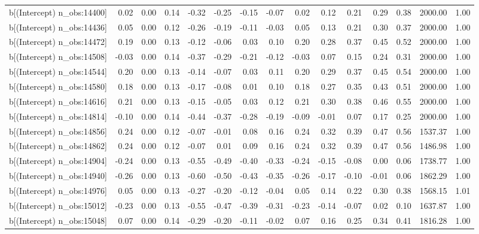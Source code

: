 \begin{table}[ht]
\begin{tabular}{rrrrrrrrrrrrrrr}
  b[(Intercept) n\_obs:14400] & 0.02 & 0.00 & 0.14 & -0.32 & -0.25 & -0.15 & -0.07 & 0.02 & 0.12 & 0.21 & 0.29 & 0.38 & 2000.00 & 1.00 \\ 
  b[(Intercept) n\_obs:14436] & 0.05 & 0.00 & 0.12 & -0.26 & -0.19 & -0.11 & -0.03 & 0.05 & 0.13 & 0.21 & 0.30 & 0.37 & 2000.00 & 1.00 \\ 
  b[(Intercept) n\_obs:14472] & 0.19 & 0.00 & 0.13 & -0.12 & -0.06 & 0.03 & 0.10 & 0.20 & 0.28 & 0.37 & 0.45 & 0.52 & 2000.00 & 1.00 \\ 
  b[(Intercept) n\_obs:14508] & -0.03 & 0.00 & 0.14 & -0.37 & -0.29 & -0.21 & -0.12 & -0.03 & 0.07 & 0.15 & 0.24 & 0.31 & 2000.00 & 1.00 \\ 
  b[(Intercept) n\_obs:14544] & 0.20 & 0.00 & 0.13 & -0.14 & -0.07 & 0.03 & 0.11 & 0.20 & 0.29 & 0.37 & 0.45 & 0.54 & 2000.00 & 1.00 \\ 
  b[(Intercept) n\_obs:14580] & 0.18 & 0.00 & 0.13 & -0.17 & -0.08 & 0.01 & 0.10 & 0.18 & 0.27 & 0.35 & 0.43 & 0.51 & 2000.00 & 1.00 \\ 
  b[(Intercept) n\_obs:14616] & 0.21 & 0.00 & 0.13 & -0.15 & -0.05 & 0.03 & 0.12 & 0.21 & 0.30 & 0.38 & 0.46 & 0.55 & 2000.00 & 1.00 \\ 
  b[(Intercept) n\_obs:14814] & -0.10 & 0.00 & 0.14 & -0.44 & -0.37 & -0.28 & -0.19 & -0.09 & -0.01 & 0.07 & 0.17 & 0.25 & 2000.00 & 1.00 \\ 
  b[(Intercept) n\_obs:14856] & 0.24 & 0.00 & 0.12 & -0.07 & -0.01 & 0.08 & 0.16 & 0.24 & 0.32 & 0.39 & 0.47 & 0.56 & 1537.37 & 1.00 \\ 
  b[(Intercept) n\_obs:14862] & 0.24 & 0.00 & 0.12 & -0.07 & 0.01 & 0.09 & 0.16 & 0.24 & 0.32 & 0.39 & 0.47 & 0.56 & 1486.98 & 1.00 \\ 
  b[(Intercept) n\_obs:14904] & -0.24 & 0.00 & 0.13 & -0.55 & -0.49 & -0.40 & -0.33 & -0.24 & -0.15 & -0.08 & 0.00 & 0.06 & 1738.77 & 1.00 \\ 
  b[(Intercept) n\_obs:14940] & -0.26 & 0.00 & 0.13 & -0.60 & -0.50 & -0.43 & -0.35 & -0.26 & -0.17 & -0.10 & -0.01 & 0.06 & 1862.29 & 1.00 \\ 
  b[(Intercept) n\_obs:14976] & 0.05 & 0.00 & 0.13 & -0.27 & -0.20 & -0.12 & -0.04 & 0.05 & 0.14 & 0.22 & 0.30 & 0.38 & 1568.15 & 1.01 \\ 
  b[(Intercept) n\_obs:15012] & -0.23 & 0.00 & 0.13 & -0.55 & -0.47 & -0.39 & -0.31 & -0.23 & -0.14 & -0.07 & 0.02 & 0.10 & 1637.87 & 1.00 \\ 
  b[(Intercept) n\_obs:15048] & 0.07 & 0.00 & 0.14 & -0.29 & -0.20 & -0.11 & -0.02 & 0.07 & 0.16 & 0.25 & 0.34 & 0.41 & 1816.28 & 1.00 \\ 

\end{tabular}
\end{table}
